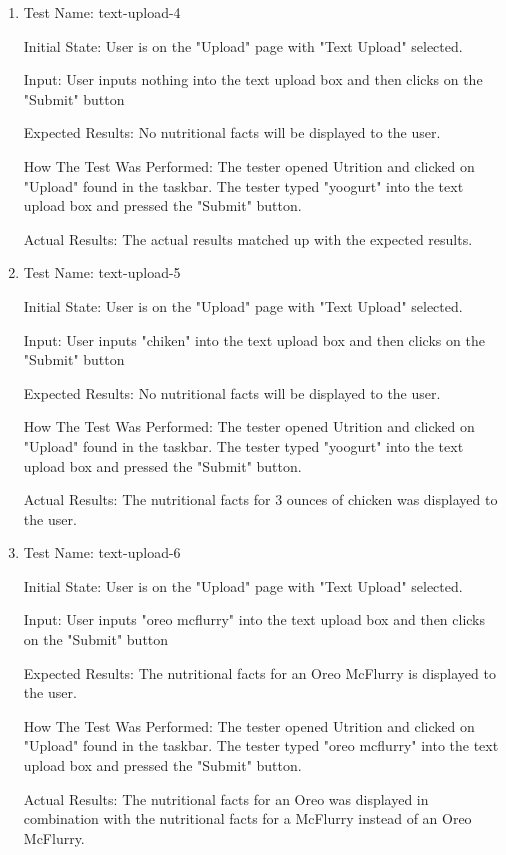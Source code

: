 \documentclass[12pt, titlepage]{article}
\begin{document}
\begin{enumerate}
		\item{Test Name: text-upload-4}
		
		Initial State: User is on the "Upload" page with "Text Upload" selected.
		
		Input: User inputs nothing into the text upload box and then clicks on the "Submit" button
		
		Expected Results: No nutritional facts will be displayed to the user.
		
		How The Test Was Performed: The tester opened Utrition and clicked on "Upload" found in the taskbar. The tester typed "yoogurt" into the text upload box and pressed the "Submit" button.
		
		Actual Results: The actual results matched up with the expected results.
	
		\item{Test Name: text-upload-5}
		
		Initial State: User is on the "Upload" page with "Text Upload" selected.
		
		Input: User inputs "chiken" into the text upload box and then clicks on the "Submit" button
		
		Expected Results: No nutritional facts will be displayed to the user.
		
		How The Test Was Performed: The tester opened Utrition and clicked on "Upload" found in the taskbar. The tester typed "yoogurt" into the text upload box and pressed the "Submit" button.
		
		Actual Results: The nutritional facts for 3 ounces of chicken was displayed to the user.
		
		\item{Test Name: text-upload-6}
		
		Initial State: User is on the "Upload" page with "Text Upload" selected.
		
		Input: User inputs "oreo mcflurry" into the text upload box and then clicks on the "Submit" button
		
		Expected Results: The nutritional facts for an Oreo McFlurry is displayed to the user.
		
		How The Test Was Performed: The tester opened Utrition and clicked on "Upload" found in the taskbar. The tester typed "oreo mcflurry" into the text upload box and pressed the "Submit" button.
		
		Actual Results: The nutritional facts for an Oreo was displayed in combination with the nutritional facts for a McFlurry instead of an Oreo McFlurry.
		

\end{enumerate}
\end{document}
